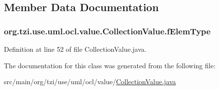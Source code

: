 \subsection{Member Data Documentation}
\hypertarget{classorg_1_1tzi_1_1use_1_1uml_1_1ocl_1_1value_1_1_collection_value_a581086bafd3a86167b6215787e81eec2}{
\subsubsection[{f\-Elem\-Type}]{ org.\-tzi.\-use.\-uml.\-ocl.\-value.\-Collection\-Value.\-f\-Elem\-Type\hspace{0.3cm}{\ttfamily [protected]}}}\label{classorg_1_1tzi_1_1use_1_1uml_1_1ocl_1_1value_1_1_collection_value_a581086bafd3a86167b6215787e81eec2}


Definition at line 52 of file Collection\-Value.\-java.



The documentation for this class was generated from the following file\-:\begin{DoxyCompactItemize}
\item 
src/main/org/tzi/use/uml/ocl/value/\hyperlink{_collection_value_8java}{Collection\-Value.\-java}\end{DoxyCompactItemize}
